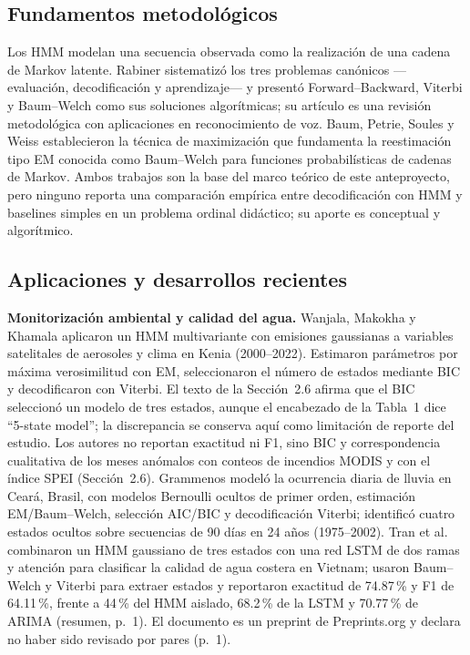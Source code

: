 \documentclass[11pt,a4paper]{article}
\begin{document}
\subsection{Fundamentos metodológicos}

Los HMM modelan una secuencia observada como la realización de una cadena de Markov latente. Rabiner \cite{rabiner1989} sistematizó los tres problemas canónicos ---evaluación, decodificación y aprendizaje--- y presentó Forward--Backward, Viterbi y Baum--Welch como sus soluciones algorítmicas; su artículo es una revisión metodológica con aplicaciones en reconocimiento de voz. Baum, Petrie, Soules y Weiss \cite{baum1970} establecieron la técnica de maximización que fundamenta la reestimación tipo EM conocida como Baum--Welch para funciones probabilísticas de cadenas de Markov. Ambos trabajos son la base del marco teórico de este anteproyecto, pero ninguno reporta una comparación empírica entre decodificación con HMM y baselines simples en un problema ordinal didáctico; su aporte es conceptual y algorítmico.

\subsection{Aplicaciones y desarrollos recientes}

\textbf{Monitorización ambiental y calidad del agua.} Wanjala, Makokha y Khamala \cite{wanjala2025} aplicaron un HMM multivariante con emisiones gaussianas a variables satelitales de aerosoles y clima en Kenia (2000--2022). Estimaron parámetros por máxima verosimilitud con EM, seleccionaron el número de estados mediante BIC y decodificaron con Viterbi. El texto de la Sección~2.6 afirma que el BIC seleccionó un modelo de tres estados, aunque el encabezado de la Tabla~1 dice ``5-state model''; la discrepancia se conserva aquí como limitación de reporte del estudio. Los autores no reportan exactitud ni F1, sino BIC y correspondencia cualitativa de los meses anómalos con conteos de incendios MODIS y con el índice SPEI (Sección~2.6). Grammenos \cite{grammenos2025} modeló la ocurrencia diaria de lluvia en Ceará, Brasil, con modelos Bernoulli ocultos de primer orden, estimación EM/Baum--Welch, selección AIC/BIC y decodificación Viterbi; identificó cuatro estados ocultos sobre secuencias de 90 días en 24 años (1975--2002). Tran et al. \cite{tran2026} combinaron un HMM gaussiano de tres estados con una red LSTM de dos ramas y atención para clasificar la calidad de agua costera en Vietnam; usaron Baum--Welch y Viterbi para extraer estados y reportaron exactitud de 74.87\,\% y F1 de 64.11\,\%, frente a 44\,\% del HMM aislado, 68.2\,\% de la LSTM y 70.77\,\% de ARIMA (resumen, p.~1). El documento es un preprint de Preprints.org y declara no haber sido revisado por pares (p.~1).
\end{document}
